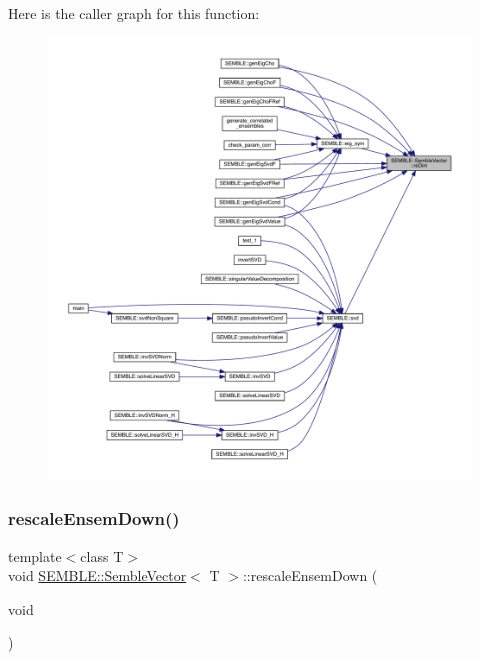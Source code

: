 Here is the caller graph for this function\+:
\nopagebreak
\begin{figure}[H]
\begin{center}
\leavevmode
\includegraphics[width=350pt]{d9/d94/structSEMBLE_1_1SembleVector_a145668e54bc3ebd9a47e7bfd2646947a_icgraph}
\end{center}
\end{figure}
\mbox{\label{structSEMBLE_1_1SembleVector_acda114b0659e31c0130b4b6eb0d4701d}} 
\subsubsection{\texorpdfstring{rescaleEnsemDown()}{rescaleEnsemDown()}\hspace{0.1cm}{\footnotesize\ttfamily [1/2]}}
{\footnotesize\ttfamily template$<$class T$>$ \\
void \mbox{\hyperlink{structSEMBLE_1_1SembleVector}{S\+E\+M\+B\+L\+E\+::\+Semble\+Vector}}$<$ T $>$\+::rescale\+Ensem\+Down (\begin{DoxyParamCaption}\item[{void}]{ }\end{DoxyParamCaption})\hspace{0.3cm}{\ttfamily [inline]}}

